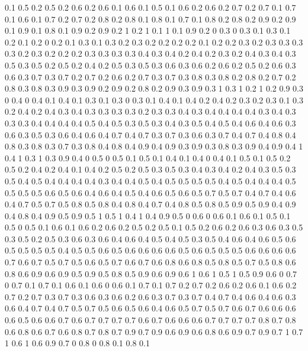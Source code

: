 0.1 0.5
0.2 0.5
0.2 0.6
0.2 0.6
0.1 0.6
0.1 0.5
0.1 0.6
0.2 0.6
0.2 0.7
0.2 0.7
0.1 0.7
0.1 0.6
0.1 0.7
0.2 0.7
0.2 0.8
0.2 0.8
0.1 0.8
0.1 0.7
0.1 0.8
0.2 0.8
0.2 0.9
0.2 0.9
0.1 0.9
0.1 0.8
0.1 0.9
0.2 0.9
0.2 1
0.2 1
0.1 1
0.1 0.9
0.2 0
0.3 0
0.3 0.1
0.3 0.1
0.2 0.1
0.2 0
0.2 0.1
0.3 0.1
0.3 0.2
0.3 0.2
0.2 0.2
0.2 0.1
0.2 0.2
0.3 0.2
0.3 0.3
0.3 0.3
0.2 0.3
0.2 0.2
0.2 0.3
0.3 0.3
0.3 0.4
0.3 0.4
0.2 0.4
0.2 0.3
0.2 0.4
0.3 0.4
0.3 0.5
0.3 0.5
0.2 0.5
0.2 0.4
0.2 0.5
0.3 0.5
0.3 0.6
0.3 0.6
0.2 0.6
0.2 0.5
0.2 0.6
0.3 0.6
0.3 0.7
0.3 0.7
0.2 0.7
0.2 0.6
0.2 0.7
0.3 0.7
0.3 0.8
0.3 0.8
0.2 0.8
0.2 0.7
0.2 0.8
0.3 0.8
0.3 0.9
0.3 0.9
0.2 0.9
0.2 0.8
0.2 0.9
0.3 0.9
0.3 1
0.3 1
0.2 1
0.2 0.9
0.3 0
0.4 0
0.4 0.1
0.4 0.1
0.3 0.1
0.3 0
0.3 0.1
0.4 0.1
0.4 0.2
0.4 0.2
0.3 0.2
0.3 0.1
0.3 0.2
0.4 0.2
0.4 0.3
0.4 0.3
0.3 0.3
0.3 0.2
0.3 0.3
0.4 0.3
0.4 0.4
0.4 0.4
0.3 0.4
0.3 0.3
0.3 0.4
0.4 0.4
0.4 0.5
0.4 0.5
0.3 0.5
0.3 0.4
0.3 0.5
0.4 0.5
0.4 0.6
0.4 0.6
0.3 0.6
0.3 0.5
0.3 0.6
0.4 0.6
0.4 0.7
0.4 0.7
0.3 0.7
0.3 0.6
0.3 0.7
0.4 0.7
0.4 0.8
0.4 0.8
0.3 0.8
0.3 0.7
0.3 0.8
0.4 0.8
0.4 0.9
0.4 0.9
0.3 0.9
0.3 0.8
0.3 0.9
0.4 0.9
0.4 1
0.4 1
0.3 1
0.3 0.9
0.4 0
0.5 0
0.5 0.1
0.5 0.1
0.4 0.1
0.4 0
0.4 0.1
0.5 0.1
0.5 0.2
0.5 0.2
0.4 0.2
0.4 0.1
0.4 0.2
0.5 0.2
0.5 0.3
0.5 0.3
0.4 0.3
0.4 0.2
0.4 0.3
0.5 0.3
0.5 0.4
0.5 0.4
0.4 0.4
0.4 0.3
0.4 0.4
0.5 0.4
0.5 0.5
0.5 0.5
0.4 0.5
0.4 0.4
0.4 0.5
0.5 0.5
0.5 0.6
0.5 0.6
0.4 0.6
0.4 0.5
0.4 0.6
0.5 0.6
0.5 0.7
0.5 0.7
0.4 0.7
0.4 0.6
0.4 0.7
0.5 0.7
0.5 0.8
0.5 0.8
0.4 0.8
0.4 0.7
0.4 0.8
0.5 0.8
0.5 0.9
0.5 0.9
0.4 0.9
0.4 0.8
0.4 0.9
0.5 0.9
0.5 1
0.5 1
0.4 1
0.4 0.9
0.5 0
0.6 0
0.6 0.1
0.6 0.1
0.5 0.1
0.5 0
0.5 0.1
0.6 0.1
0.6 0.2
0.6 0.2
0.5 0.2
0.5 0.1
0.5 0.2
0.6 0.2
0.6 0.3
0.6 0.3
0.5 0.3
0.5 0.2
0.5 0.3
0.6 0.3
0.6 0.4
0.6 0.4
0.5 0.4
0.5 0.3
0.5 0.4
0.6 0.4
0.6 0.5
0.6 0.5
0.5 0.5
0.5 0.4
0.5 0.5
0.6 0.5
0.6 0.6
0.6 0.6
0.5 0.6
0.5 0.5
0.5 0.6
0.6 0.6
0.6 0.7
0.6 0.7
0.5 0.7
0.5 0.6
0.5 0.7
0.6 0.7
0.6 0.8
0.6 0.8
0.5 0.8
0.5 0.7
0.5 0.8
0.6 0.8
0.6 0.9
0.6 0.9
0.5 0.9
0.5 0.8
0.5 0.9
0.6 0.9
0.6 1
0.6 1
0.5 1
0.5 0.9
0.6 0
0.7 0
0.7 0.1
0.7 0.1
0.6 0.1
0.6 0
0.6 0.1
0.7 0.1
0.7 0.2
0.7 0.2
0.6 0.2
0.6 0.1
0.6 0.2
0.7 0.2
0.7 0.3
0.7 0.3
0.6 0.3
0.6 0.2
0.6 0.3
0.7 0.3
0.7 0.4
0.7 0.4
0.6 0.4
0.6 0.3
0.6 0.4
0.7 0.4
0.7 0.5
0.7 0.5
0.6 0.5
0.6 0.4
0.6 0.5
0.7 0.5
0.7 0.6
0.7 0.6
0.6 0.6
0.6 0.5
0.6 0.6
0.7 0.6
0.7 0.7
0.7 0.7
0.6 0.7
0.6 0.6
0.6 0.7
0.7 0.7
0.7 0.8
0.7 0.8
0.6 0.8
0.6 0.7
0.6 0.8
0.7 0.8
0.7 0.9
0.7 0.9
0.6 0.9
0.6 0.8
0.6 0.9
0.7 0.9
0.7 1
0.7 1
0.6 1
0.6 0.9
0.7 0
0.8 0
0.8 0.1
0.8 0.1

